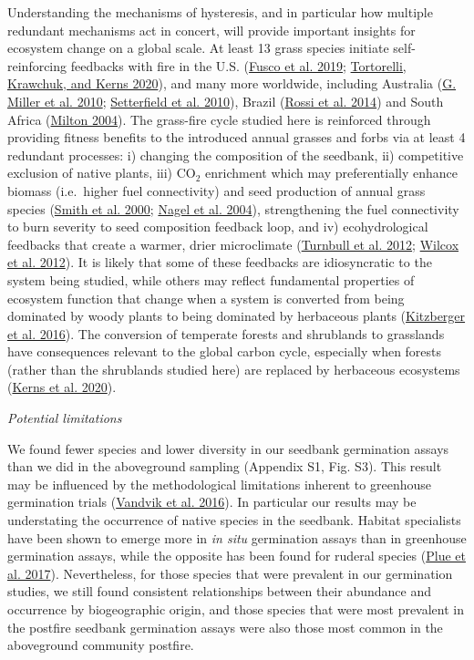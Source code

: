 \documentclass[
  12pt,
]{article}
\begin{document}
Understanding the mechanisms of hysteresis, and in particular how
multiple redundant mechanisms act in concert, will provide important
insights for ecosystem change on a global scale. At least 13 grass
species initiate self-reinforcing feedbacks with fire in the U.S.
(\protect\hyperlink{ref-Fusco2019}{Fusco et al. 2019};
\protect\hyperlink{ref-Tortorelli2020}{Tortorelli, Krawchuk, and Kerns
2020}), and many more worldwide, including Australia
(\protect\hyperlink{ref-Miller2010}{G. Miller et al. 2010};
\protect\hyperlink{ref-Setterfield2010}{Setterfield et al. 2010}),
Brazil (\protect\hyperlink{ref-Rossi2014}{Rossi et al. 2014}) and South
Africa (\protect\hyperlink{ref-Milton2004}{Milton 2004}). The grass-fire
cycle studied here is reinforced through providing fitness benefits to
the introduced annual grasses and forbs via at least 4 redundant
processes: i) changing the composition of the seedbank, ii) competitive
exclusion of native plants, iii) CO\(_2\) enrichment which may
preferentially enhance biomass (i.e.~higher fuel connectivity) and seed
production of annual grass species
(\protect\hyperlink{ref-Smith2000}{Smith et al. 2000};
\protect\hyperlink{ref-Nagel2004}{Nagel et al. 2004}), strengthening the
fuel connectivity to burn severity to seed composition feedback loop,
and iv) ecohydrological feedbacks that create a warmer, drier
microclimate (\protect\hyperlink{ref-Turnbull2012}{Turnbull et al.
2012}; \protect\hyperlink{ref-Wilcox2012}{Wilcox et al. 2012}). It is
likely that some of these feedbacks are idiosyncratic to the system
being studied, while others may reflect fundamental properties of
ecosystem function that change when a system is converted from being
dominated by woody plants to being dominated by herbaceous plants
(\protect\hyperlink{ref-Kitzberger2016}{Kitzberger et al. 2016}). The
conversion of temperate forests and shrublands to grasslands have
consequences relevant to the global carbon cycle, especially when
forests (rather than the shrublands studied here) are replaced by
herbaceous ecosystems (\protect\hyperlink{ref-Kerns2020}{Kerns et al.
2020}).

\emph{Potential limitations}

We found fewer species and lower diversity in our seedbank germination
assays than we did in the aboveground sampling (Appendix S1, Fig. S3).
This result may be influenced by the methodological limitations inherent
to greenhouse germination trials
(\protect\hyperlink{ref-Vandvik2016}{Vandvik et al. 2016}). In
particular our results may be understating the occurrence of native
species in the seedbank. Habitat specialists have been shown to emerge
more in \emph{in situ} germination assays than in greenhouse germination
assays, while the opposite has been found for ruderal species
(\protect\hyperlink{ref-Plue2017}{Plue et al. 2017}). Nevertheless, for
those species that were prevalent in our germination studies, we still
found consistent relationships between their abundance and occurrence by
biogeographic origin, and those species that were most prevalent in the
postfire seedbank germination assays were also those most common in the
aboveground community postfire.
\end{document}
